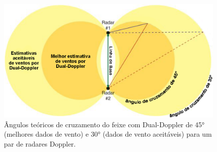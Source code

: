 \begin{figure}[htb]
	\begin{center}
		\caption{Ângulos teóricos de cruzamento do feixe com Dual-Doppler de \ang{45} (melhores dados de vento) e \ang{30} (dados de vento aceitáveis) para um par de radares Doppler.} 
		\label{doppler_theory_lobes}
		\includegraphics[width=\columnwidth]{figs/lobes_eastin_ptbr.png}
	\end{center}
\end{figure}

